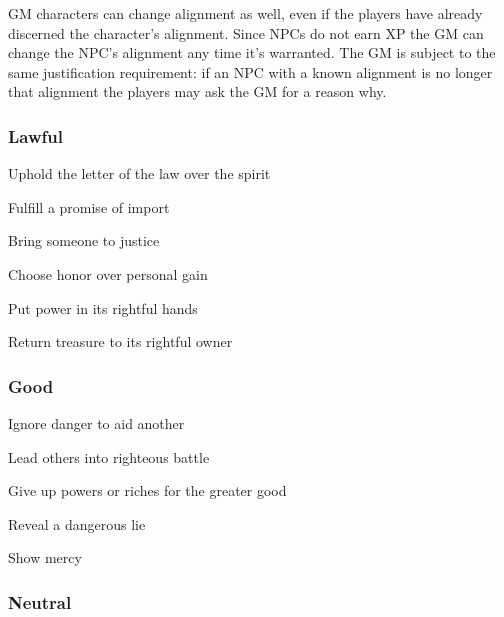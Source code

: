  

GM characters can change alignment as well, even if the players have already discerned the character's alignment. Since NPCs do not earn XP the GM can change the NPC's alignment any time it's warranted. The GM is subject to the same justification requirement: if an NPC with a known alignment is no longer that alignment the players may ask the GM for a reason why.

 
\subsubsection{Lawful}   
 
\startitemize[1,packed]

\item Uphold the letter of the law over the spirit

 
\item Fulfill a promise of import

 
\item Bring someone to justice

 
\item Choose honor over personal gain

 
\item Put power in its rightful hands

 
\item Return treasure to its rightful owner


\stopitemize
 
\subsubsection{Good}   
 
\startitemize[1,packed]

\item Ignore danger to aid another

 
\item Lead others into righteous battle

 
\item Give up powers or riches for the greater good

 
\item Reveal a dangerous lie

 
\item Show mercy


\stopitemize
 
\subsubsection{Neutral}   
 
